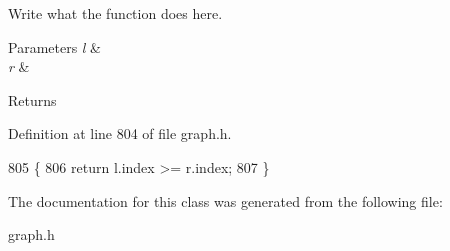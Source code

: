 Write what the function does here. 


\begin{DoxyParams}{Parameters}
{\em l} & \\
\hline
{\em r} & \\
\hline
\end{DoxyParams}
\begin{DoxyReturn}{Returns}

\end{DoxyReturn}


Definition at line 804 of file graph.\+h.


\begin{DoxyCode}
805     \{
806         \textcolor{keywordflow}{return} l.index >= r.index;
807     \}
\end{DoxyCode}


The documentation for this class was generated from the following file\+:\begin{DoxyCompactItemize}
\item 
graph.\+h\end{DoxyCompactItemize}
